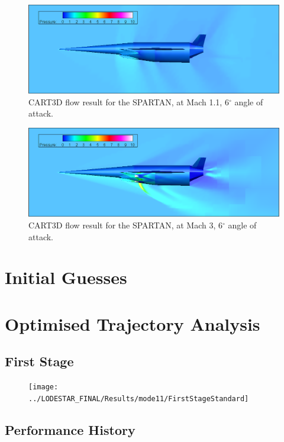 		\begin{figure}
			\centering
			\includegraphics[width=0.9\linewidth]{figures/3_vehicle_design/M1p1AoA6}
			\caption{CART3D flow result for the SPARTAN, at Mach 1.1, 6$^\circ$ angle of attack.}
			\label{fig:M1}
		\end{figure}
		\begin{figure}
			\centering
			\includegraphics[width=0.9\linewidth]{figures/3_vehicle_design/M3AoA6}
			\caption{CART3D flow result for the SPARTAN, at Mach 3, 6$^\circ$ angle of attack.}
			\label{fig:M3AoA6}
		\end{figure}
		
		
		
		
		\chapter{Initial Guesses}
		
		\chapter{Optimised Trajectory Analysis}
		
		
		\section{First Stage}\label{sec:appendix_firststage}
\begin{figure}[ht!]
	\centering
	\texttt{[image: ../LODESTAR\_FINAL/Results/mode11/FirstStageStandard]}
	\caption{}
	\label{fig:FirstStageStandard}
\end{figure}
		
		\section{Performance History}
		
